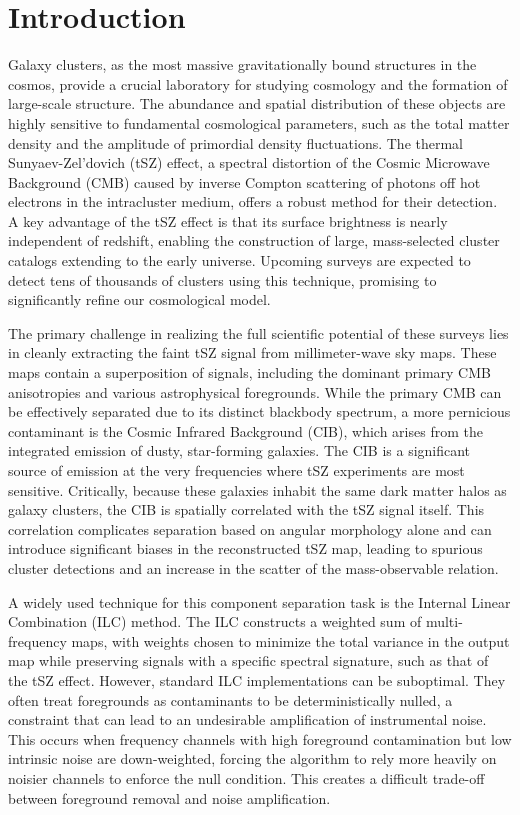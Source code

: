 \documentclass[]{article}
\begin{document}
\section{Introduction}
\label{sec:intro}
Galaxy clusters, as the most massive gravitationally bound structures in the cosmos, provide a crucial laboratory for studying cosmology and the formation of large-scale structure. The abundance and spatial distribution of these objects are highly sensitive to fundamental cosmological parameters, such as the total matter density and the amplitude of primordial density fluctuations. The thermal Sunyaev-Zel'dovich (tSZ) effect, a spectral distortion of the Cosmic Microwave Background (CMB) caused by inverse Compton scattering of photons off hot electrons in the intracluster medium, offers a robust method for their detection. A key advantage of the tSZ effect is that its surface brightness is nearly independent of redshift, enabling the construction of large, mass-selected cluster catalogs extending to the early universe. Upcoming surveys are expected to detect tens of thousands of clusters using this technique, promising to significantly refine our cosmological model.

The primary challenge in realizing the full scientific potential of these surveys lies in cleanly extracting the faint tSZ signal from millimeter-wave sky maps. These maps contain a superposition of signals, including the dominant primary CMB anisotropies and various astrophysical foregrounds. While the primary CMB can be effectively separated due to its distinct blackbody spectrum, a more pernicious contaminant is the Cosmic Infrared Background (CIB), which arises from the integrated emission of dusty, star-forming galaxies. The CIB is a significant source of emission at the very frequencies where tSZ experiments are most sensitive. Critically, because these galaxies inhabit the same dark matter halos as galaxy clusters, the CIB is spatially correlated with the tSZ signal itself. This correlation complicates separation based on angular morphology alone and can introduce significant biases in the reconstructed tSZ map, leading to spurious cluster detections and an increase in the scatter of the mass-observable relation.

A widely used technique for this component separation task is the Internal Linear Combination (ILC) method. The ILC constructs a weighted sum of multi-frequency maps, with weights chosen to minimize the total variance in the output map while preserving signals with a specific spectral signature, such as that of the tSZ effect. However, standard ILC implementations can be suboptimal. They often treat foregrounds as contaminants to be deterministically nulled, a constraint that can lead to an undesirable amplification of instrumental noise. This occurs when frequency channels with high foreground contamination but low intrinsic noise are down-weighted, forcing the algorithm to rely more heavily on noisier channels to enforce the null condition. This creates a difficult trade-off between foreground removal and noise amplification.
\end{document}
